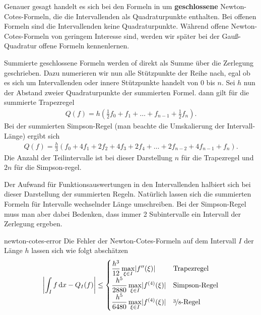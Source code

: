 \begin{remark}
  Genauer gesagt handelt es sich bei den Formeln in
   um \textbf{geschlossene}
  Newton-Cotes-Formeln, die die Intervallenden als Quadraturpunkte
  enthalten.  Bei offenen Formeln sind die Intervallenden keine
  Quadraturpunkte. Während offene Newton-Cotes-Formeln von geringem
  Interesse sind, werden wir später bei der Gauß-Quadratur offene
  Formeln kennenlernen.

  Summierte geschlossene Formeln werden of direkt als Summe über die
  Zerlegung geschrieben. Dazu numerieren wir nun alle Stützpunkte der
  Reihe nach, egal ob es sich um Intervallenden oder innere
  Stützpunkte handelt von 0 bis $n$.
  Sei $h$ nun der Abstand zweier Quadraturpunkte
  der summierten Formel. dann gilt für die summierte Trapezregel
  \begin{gather}
    Q(f) = h\left(\tfrac12 f_0 + f_1 +\dots+f_{n-1}+\tfrac12 f_n\right).
  \end{gather}
  Bei der summierten Simpson-Regel (man beachte die Umskalierung der Intervall-Länge) ergibt sich
  \begin{gather}
    Q(f) = \tfrac h3\left(f_0 + 4 f_1 + 2 f_2 + 4 f_3 + 2 f_4
      + \dots + 2 f_{n-2} + 4 f_{n-1} + f_{n}\right).
  \end{gather}
  Die Anzahl der Teilintervalle ist bei dieser Darstellung $n$ für die
  Trapezregel und $2n$ für die Simpson-regel.
  
  Der Aufwand für Funktionsauswertungen in den Intervallenden halbiert
  sich bei dieser Darstellung der summierten Regeln. Natürlich lassen
  sich die summierten Formeln für Intervalle wechselnder Länge
  umschreiben. Bei der Simpson-Regel muss man aber dabei Bedenken,
  dass immer 2 Subintervalle ein Intervall der Zerlegung ergeben.
\end{remark}


\begin{Satz}{newton-cotes-error}
  Die Fehler der Newton-Cotes-Formeln auf dem Intervall $I$ der Länge
  $h$ lassen sich wie folgt abschätzen
  \begin{gather}
    \left|\int_I f\,\mathrm{d} x - Q_I(f)\right| \le
    \begin{cases}
      \dfrac{h^3}{12}\max\limits_{\xi\in I}\lvert f''(\xi)\rvert
      &\text{Trapezregel}\\
      \dfrac{h^5}{2880}\max\limits_{\xi\in I}\lvert f^{(4)}(\xi)\rvert
      &\text{Simpson-Regel}\\
      \dfrac{h^5}{6480}\max\limits_{\xi\in I}\lvert f^{(4)}(\xi)\rvert
      &\text{\nicefrac38-Regel}
    \end{cases}
  \end{gather}
\end{Satz}

